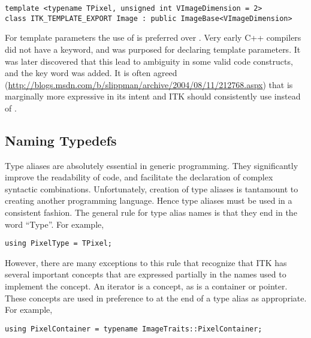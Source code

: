\small
\begin{verbatim}
template <typename TPixel, unsigned int VImageDimension = 2>
class ITK_TEMPLATE_EXPORT Image : public ImageBase<VImageDimension>
\end{verbatim}
\normalsize

For template parameters the use of  is preferred over
. Very early C++ compilers did not have a  keyword,
and  was purposed for declaring template parameters. It was later
discovered that this lead to ambiguity in some valid code constructs, and the
 key word was added. It is often agreed
(\href{http://blogs.msdn.com/b/slippman/archive/2004/08/11/212768.aspx}
{http://blogs.msdn.com/b/slippman/archive/2004/08/11/212768.aspx}) that
 is marginally more expressive in its intent and ITK should
consistently use  instead of .


\subsection{Naming Typedefs}
\label{subsec:NamingTypedefs}

Type aliases are absolutely essential in generic programming. They significantly
improve the readability of code, and facilitate the declaration of complex
syntactic combinations. Unfortunately, creation of type aliases is tantamount to
creating another programming language. Hence type aliases must be used in a
consistent fashion. The general rule for type alias names is that they end in the
word ``Type''. For example,

\small
\begin{verbatim}
using PixelType = TPixel;
\end{verbatim}
\normalsize

However, there are many exceptions to this rule that recognize that ITK has
several important concepts that are expressed partially in the names used to
implement the concept. An iterator is a concept, as is a container or pointer.
These concepts are used in preference to  at the end of a type alias as
appropriate. For example,

\small
\begin{verbatim}
using PixelContainer = typename ImageTraits::PixelContainer;
\end{verbatim}
\normalsize

